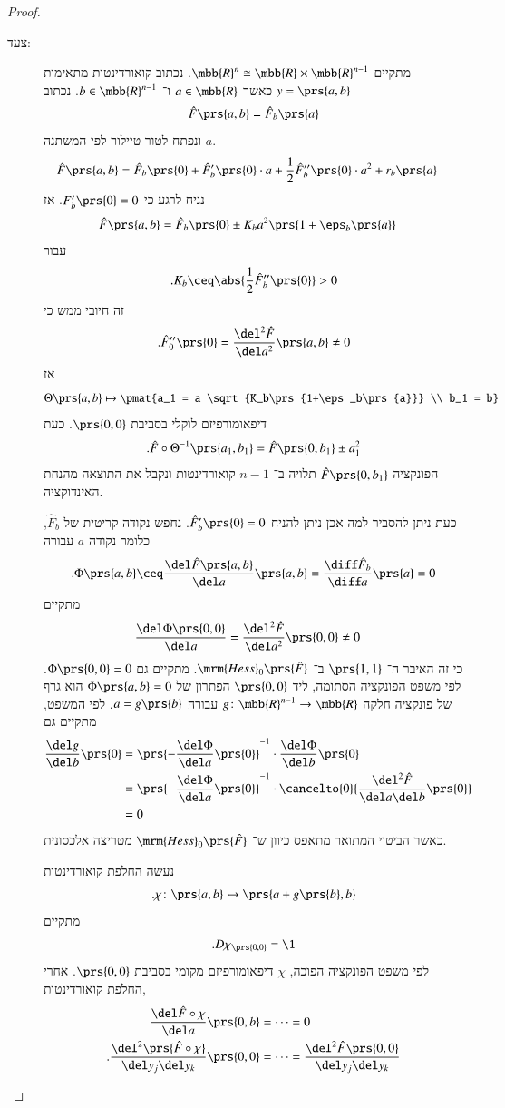 \documentclass[a4paper,10pt,twoside,openany]{book}
\begin{document}
\begin{proof}
\begin{description}
\item[צעד:]
מתקיים
$\mbb{R}^n \cong \mbb{R} \times \mbb{R}^{n-1}$.
נכתוב קואורדינטות מתאימות
$y = \prs{a,b}$
כאשר
$a \in \mbb{R}$
ו־%
$b \in \mbb{R}^{n-1}$.
נכתוב
\[\hat{F}\prs{a,b} = \hat{F}_b\prs{a}\]
ונפתח לטור טיילור לפי המשתנה
$a$.
\begin{align*}
\hat{F}\prs{a,b} &= \hat{F}_b\prs{0} + \hat{F}_b'\prs{0} \cdot a + \frac{1}{2} \hat{F}_b''\prs{0} \cdot a^2 + r_b\prs{a}
\end{align*}
נניח לרגע כי
$F'_b\prs{0} = 0$.
אז
\begin{align*}
\hat{F}\prs{a,b} &= \hat{F}_b\prs{0} \pm K_b a^2 \prs{1+\eps_b\prs{a}}
\end{align*}
עבור
\[\text{.} K_b \ceq \abs{\frac{1}{2} \hat{F}_b''\prs{0}} > 0\]
זה חיובי ממש כי
\[\text{.} \hat{F}_0''\prs{0} = \frac{\del^2 \hat{F}}{\del a^2} \prs{a,b} \neq 0\]
אז
\[\Theta\prs{a,b} \mapsto \pmat{a_1 = a \sqrt{K_b\prs{1+\eps_b\prs{a}}} \\ b_1 = b}\]
דיפאומורפיזם לוקלי בסביבת
$\prs{0,0}$.
כעת
\[\text{.} \hat{F} \circ \Theta^{-1}\prs{a_1, b_1} = \hat{F}\prs{0,b_1} \pm a_1^2\]
הפונקציה
$\hat{F}\prs{0,b_1}$
תלויה ב־%
$n-1$
קואורדינטות ונקבל את התוצאה מהנחת האינדוקציה.

כעת ניתן להסביר למה אכן ניתן להניח
$\hat{F}_{b}'\prs{0} = 0$.
נחפש נקודה קריטית של
$\hat{F}_b$,
כלומר נקודה
$a$
עבורה
\[\text{.} \Phi\prs{a,b} \ceq \frac{\del \hat{F}\prs{a,b}}{\del a}{\prs{a,b}} = \frac{\diff \hat{F}_b}{\diff a} \prs{a} = 0\]
מתקיים
\begin{align*}
\frac{\del \Phi\prs{0,0}}{\del a} &= \frac{\del^2 \hat{F}}{\del a^2} \prs{0,0} \neq 0
\end{align*}
כי זה האיבר ה־%
$\prs{1,1}$
ב־%
$\mrm{Hess}_0\prs{\hat{F}}$.
מתקיים גם
$\Phi\prs{0,0} = 0$.
לפי משפט הפונקציה הסתומה, ליד
$\prs{0,0}$
הפתרון של
$\Phi\prs{a,b} = 0$
הוא גרף של פונקציה חלקה
$g \colon \mbb{R}^{n-1} \to \mbb{R}$
עבורה
$a = g\prs{b}$.
לפי המשפט, מתקיים גם
\begin{align*}
\frac{\del g}{\del b}\prs{0} &= \prs{-\frac{\del \Phi}{\del a}\prs{0}}^{-1} \cdot \frac{\del \Phi}{\del b}\prs{0}
\\&= 
\prs{-\frac{\del \Phi}{\del a}\prs{0}}^{-1} \cdot \cancelto{0}{\frac{\del^2 \hat{F}}{\del a \del b} \prs{0}}
\\&=0
\end{align*}
כאשר הביטוי המתואר מתאפס כיוון ש־%
$\mrm{Hess}_0\prs{\hat{F}}$
מטריצה אלכסונית.

נעשה החלפת קואורדינטות
\[\text{.} \chi \colon \prs{a,b} \mapsto \prs{a + g\prs{b},b}\]
מתקיים
\begin{align*}
\text{.} D \chi_{\prs{0,0}} = \1
\end{align*}
לפי משפט הפונקציה הפוכה,
$\chi$
דיפאומורפיזם מקומי בסביבת
$\prs{0,0}$.
אחרי החלפת קואורדינטות,
\begin{align*}
\frac{\del\hat{F} \circ \chi}{\del a} \prs{0,b} &= \cdots = 0 \\
\text{.} \frac{\del^2 \prs{\hat{F} \circ \chi}}{\del y_j \del y_k} \prs{0,0} &= \cdots =\frac{\del^2 \hat{F}\prs{0,0}}{\del y_j \del y_k}
\end{align*}


\end{description}
\end{proof}
\end{document}
